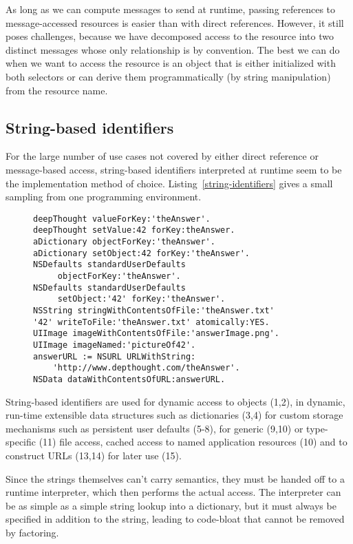 \documentclass[preprint,authoryear]{acm_proc_article-sp}
\begin{document}
As long as we can compute messages to send at runtime,
passing references to message-accessed resources is easier than with
direct references.  However, it still poses challenges, because we have decomposed
access to the resource into two distinct messages whose only relationship is by 
convention.  The best we can do when we want to access the resource
is an object that is either initialized with both selectors or can derive them
programmatically (by string manipulation) from the resource name.

\subsection{String-based identifiers}

For the large number of use cases not covered by either direct reference or
message-based access, string-based identifiers interpreted at runtime 
seem to be the implementation method of choice.  Listing~\ref{string-identifiers}
gives a small sampling from one programming environment.

\begin{figure}[htbp]
\begin{lstlisting}[style=numbers,label=string-identifiers,caption=Variants of string-based identifiers.]
deepThought valueForKey:'theAnswer'.
deepThought setValue:42 forKey:theAnswer.
aDictionary objectForKey:'theAnswer'.
aDictionary setObject:42 forKey:'theAnswer'.
NSDefaults standardUserDefaults
	 objectForKey:'theAnswer'.
NSDefaults standardUserDefaults
	 setObject:'42' forKey:'theAnswer'.
NSString stringWithContentsOfFile:'theAnswer.txt'
'42' writeToFile:'theAnswer.txt' atomically:YES.
UIImage imageWithContentsOfFile:'answerImage.png'.
UIImage imageNamed:'pictureOf42'.
answerURL := NSURL URLWithString:
	'http://www.depthought.com/theAnswer'.
NSData dataWithContentsOfURL:answerURL.
\end{lstlisting}
\end{figure}

String-based identifiers are used for dynamic access to objects (1,2), 
in dynamic, run-time extensible data structures such as
dictionaries (3,4)  for custom storage mechanisms such as persistent
user defaults (5-8), for generic (9,10) or type-specific (11) file access, cached
access to named application resources (10) and to construct URLs (13,14)
for later use (15).

Since the strings themselves can't carry semantics, they must be handed
off to a runtime interpreter, which then performs the actual access.  The 
interpreter can be as simple as a simple string lookup into a dictionary,
but it must always be specified in addition to the string, leading to 
code-bloat that cannot be removed by factoring.
\end{document}

